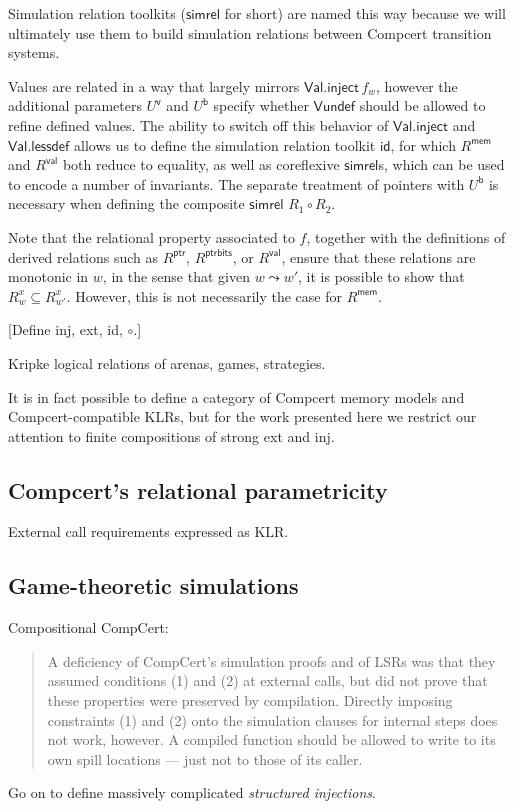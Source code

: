 \documentclass[acmsmall,anonymous]{acmart}
\newcommand{\kw}[1]{\ensuremath{ \textsf{#1} }}
\begin{document}
Simulation relation toolkits (\kw{simrel} for short)
are named this way because we will ultimately
use them to build simulation relations between
Compcert transition systems.

Values are related in a way that largely mirrors $\kw{Val.inject}\,f_w$,
however the additional parameters $U^\kw{v}$ and $U^\kw{b}$
specify whether $\kw{Vundef}$ should be allowed to refine defined values.
The ability to switch off this behavior of \kw{Val.inject} and \kw{Val.lessdef}
allows us to define the simulation relation toolkit \kw{id},
for which $R^\kw{mem}$ and $R^\kw{val}$ both reduce to equality,
as well as coreflexive \kw{simrel}s,
which can be used to encode a number of invariants.
The separate treatment of pointers with $U^\kw{b}$
is necessary when defining the composite \kw{simrel} $R_1 \circ R_2$.

Note that the relational property associated to $f$,
together with the definitions of
derived relations such as $R^\kw{ptr}$, $R^\kw{ptrbits}$, or $R^\kw{val}$,
ensure that these relations are monotonic in $w$,
in the sense that given $w \leadsto w'$,
it is possible to show that $R^x_w \subseteq R^x_{w'}$.
However,
this is not necessarily the case for $R^\kw{mem}$.



[Define inj, ext, id, $\circ$.]


Kripke logical relations of arenas, games, strategies.

It is in fact possible to define a
category of Compcert memory models and Compcert-compatible KLRs,
but for the work presented here we restrict our attention
to finite compositions of strong \textsf{ext} and \textsf{inj}.


\subsection{Compcert's relational parametricity} %

External call requirements expressed as KLR.


\subsection{Game-theoretic simulations} %

Compositional CompCert:
\begin{quote}
A deficiency of CompCert’s simulation proofs and of LSRs
was that they assumed conditions (1) and (2) at external calls,
but did not prove that these properties were preserved by compilation.
Directly imposing constraints (1) and (2)
onto the simulation clauses for internal steps does not work, however.
A compiled function should be allowed to
write to its own spill locations ---
just not to those of its caller.
\end{quote}
Go on to define massively complicated \emph{structured injections}.
\end{document}
